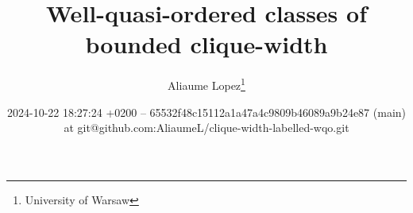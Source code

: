 %

\title{Well-quasi-ordered classes of bounded clique-width}
\author{%
        Aliaume Lopez\thanks{University of Warsaw}
    }


\date{2024-10-22 18:27:24
+0200 -- 65532f48c15112a1a47a4c9809b46089a9b24e87 (main) at git@github.com:AliaumeL/clique-width-labelled-wqo.git}


\newcommand{\makeabstract}{
\begin{abstract}
    From words to trees.
\end{abstract}
}
